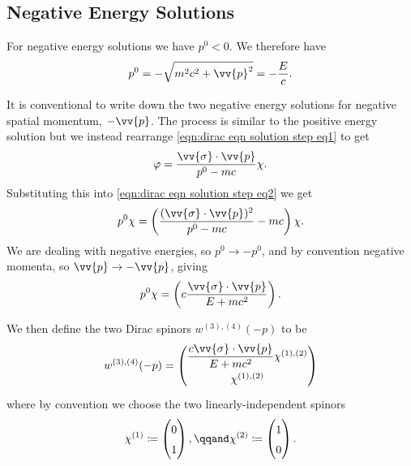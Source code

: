 \documentclass[fleqn]{NotesClass}
\begin{document}
    \subsection{Negative Energy Solutions}
    For negative energy solutions we have \(p^0 < 0\).
    We therefore have
    \begin{equation}
        p^0 = -\sqrt{m^2c^2 + \vv{p}^2} = -\frac{E}{c}.
    \end{equation}
    
    It is conventional to write down the two negative energy solutions for negative spatial momentum, \(-\vv{p}\).
    The process is similar to the positive energy solution but we instead rearrange \cref{eqn:dirac eqn solution step eq1} to get
    \begin{equation}
        \varphi = \frac{\vv{\sigma}\cdot\vv{p}}{p^0 - mc}\chi.
    \end{equation}
    Substituting this into \cref{eqn:dirac eqn solution step eq2} we get
    \begin{equation}
        p^0\chi = \left( \frac{(\vv{\sigma} \cdot \vv{p})^2}{p^0 - mc} - mc \right)\chi.
    \end{equation}
    We are dealing with negative energies, so \(p^0 \to -p^0\), and by convention negative momenta, so \(\vv{p} \to -\vv{p}\), giving
    \begin{equation}
        p^0\chi = \left( c\frac{\vv{\sigma}\cdot\vv{p}}{E + mc^2} \right).
    \end{equation}
    
    We then define the two Dirac spinors \(w^{(3),(4)}(-p)\) to be
    \begin{equation}
        w^{(3),(4)}(-p) = \renewcommand{\arraystretch}{1.5}
        \begin{pmatrix}
            \dfrac{c\vv{\sigma}\cdot\vv{p}}{E + mc^2}\chi^{(1),(2)}\\
            \chi^{(1),(2)}
        \end{pmatrix}
    \end{equation}
    where by convention we choose the two linearly-independent spinors
    \begin{equation}
        \chi^{(1)} \coloneqq 
        \begin{pmatrix}
            0\\ 1
        \end{pmatrix}
        , \qqand \chi^{(2)} \coloneqq
        \begin{pmatrix}
            1\\ 0
        \end{pmatrix}
        .
    \end{equation}
    
\end{document}
